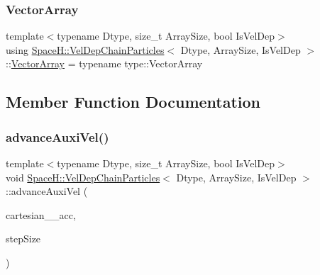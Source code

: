 \subsubsection{\texorpdfstring{Vector\+Array}{VectorArray}\hspace{0.1cm}{\footnotesize\ttfamily [2/2]}}
{\footnotesize\ttfamily template$<$typename Dtype, size\+\_\+t Array\+Size, bool Is\+Vel\+Dep$>$ \\
using \mbox{\hyperlink{class_space_h_1_1_vel_dep_chain_particles}{Space\+H\+::\+Vel\+Dep\+Chain\+Particles}}$<$ Dtype, Array\+Size, Is\+Vel\+Dep $>$\+::\mbox{\hyperlink{class_space_h_1_1_vel_indep_particles_aa9983058940249df8b00fa800e8cbad2}{Vector\+Array}} =  typename type\+::\+Vector\+Array}



\subsection{Member Function Documentation}
\mbox{\label{class_space_h_1_1_vel_dep_chain_particles_ac875237066008b4fa02feeacbbcb100a}} 
\subsubsection{\texorpdfstring{advance\+Auxi\+Vel()}{advanceAuxiVel()}\hspace{0.1cm}{\footnotesize\ttfamily [1/2]}}
{\footnotesize\ttfamily template$<$typename Dtype, size\+\_\+t Array\+Size, bool Is\+Vel\+Dep$>$ \\
void \mbox{\hyperlink{class_space_h_1_1_vel_dep_chain_particles}{Space\+H\+::\+Vel\+Dep\+Chain\+Particles}}$<$ Dtype, Array\+Size, Is\+Vel\+Dep $>$\+::advance\+Auxi\+Vel (\begin{DoxyParamCaption}\item[{const \mbox{\hyperlink{class_space_h_1_1_vel_indep_particles_aa9983058940249df8b00fa800e8cbad2}{Vector\+Array}} \&}]{cartesian_\+\_\+acc,  }\item[{\mbox{\hyperlink{class_space_h_1_1_vel_indep_particles_aeb47d8131b30ed790320ff634f0d6af1}{Scalar}}}]{step\+Size }\end{DoxyParamCaption})\hspace{0.3cm}{\ttfamily [inline]}}



